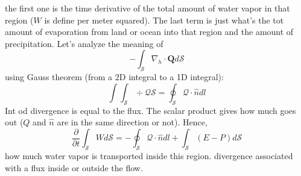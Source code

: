 the first one is the time derivative of the total amount of water vapor in that region ($W$ is define per meter squared). The last term is just what's the tot amount of evaporation from land or ocean into that region and the amount of precipitation. 
Let's analyze the meaning of 
\[-\int_{\mathcal{S}}\nabla_h\cdot\mathbf{Q}d\mathcal{S}\]
using Gauss theorem (from a 2D integral to a 1D integral):
\begin{equation}\label{eq.Gauss theorem}
    \int\int_{\mathcal{S}}\div{\mathcal{Q}}\mathcal{S}=\oint_{\mathcal{S}} \mathcal{Q}\cdot \hat{n}dl
\end{equation}
Int od divergence is equal to the flux. The scalar product gives how much goes out ($Q$ and $\hat{n}$ are in the same direction or not). Hence, 
\[\frac{\partial}{\partial t}\int_{\mathcal{S}}Wd\mathcal{S}=-\oint_{\mathcal{S}} \mathcal{Q}\cdot \hat{n}dl+\int_{\mathcal{S}}(E-P)d\mathcal{S}\]
how much water vapor is transported inside this region. divergence associated with a flux inside or outside the flow. 


